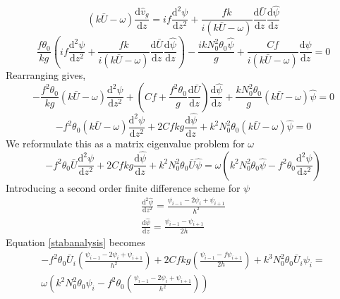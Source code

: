 \begin{equation*}
	(k\bar{U}-\omega)\frac{\text{d}\hat{v}_g}{\text{d}z} = if\frac{\text{d}^2{\psi}}{\text{d}z^2} + \frac{fk}{i(k\bar{U}-\omega)}\frac{\text{d}\bar{U}}{\text{d}z}\frac{\text{d}\hat{\psi}}{\text{d}z}
\end{equation*}
\begin{equation*}
	\frac{f\theta_0}{kg}\left(if\frac{\text{d}^2{\psi}}{\text{d}z^2} + \frac{fk}{i(k\bar{U}-\omega)}\frac{\text{d}\bar{U}}{\text{d}z}\frac{\text{d}\hat{\psi}}{\text{d}z}\right) - \frac{ik N_0^2\theta_0\hat{\psi}}{g} + \frac{Cf}{i(k\bar{U}-\omega)}\frac{\text{d}\psi}{\text{d}z} =0
\end{equation*}
Rearranging gives,
\begin{equation*}
	-\frac{f^2\theta_0}{kg}(k\bar{U}-\omega)\frac{\text{d}^2{\psi}}{\text{d}z^2}+\left(Cf+\frac{f^2\theta_0}{g}\frac{\text{d}\bar{U}}{\text{d}z}\right)\frac{\text{d}\hat{\psi}}{\text{d}z}+\frac{k N_0^2\theta_0}{g}(k\bar{U}-\omega)\hat{\psi}=0
\end{equation*}
\begin{equation*}
	-f^2\theta_0(k\bar{U}-\omega)\frac{\text{d}^2{\psi}}{\text{d}z^2}+2Cfkg\frac{\text{d}\hat{\psi}}{\text{d}z}+k^2 N_0^2\theta_0(k\bar{U}-\omega)\hat{\psi}=0
\end{equation*}
We reformulate this as a matrix eigenvalue problem for $\omega$
\begin{equation}
	-f^2\theta_0\bar{U}\frac{\text{d}^2{\psi}}{\text{d}z^2}+2Cfkg\frac{\text{d}\hat{\psi}}{\text{d}z}+k^2 N_0^2\theta_0\bar{U}\hat{\psi}=\omega \left(k^2N_0^2\theta_0\hat{\psi}-f^2\theta_0 \frac{\text{d}^2{\psi}}{\text{d}z^2}\right)
\label{stabanalysis}
\end{equation}
Introducing a second order finite difference scheme for $\psi$
\begin{equation*}
	\begin{aligned}
	\frac{\text{d}^2{\hat{\psi}}}{\text{d}z^2} = \frac{\psi_{i-1} - 2\psi_i + \psi_{i+1}}{h^2}\\
	\frac{\text{d}\hat{\psi}}{\text{d}z} = \frac{\psi_{i-1} - \psi_{i+1}}{2h}
	\end{aligned}
\end{equation*}
Equation \ref{stabanalysis} becomes
\begin{equation}
	\begin{aligned}
	-f^2\theta_0\bar{U}_i\left(\frac{\psi_{i-1} - 2\psi_i + \psi_{i+1}}{h^2}\right)+2Cfkg\left(\frac{\psi_{i-1} -f \psi_{i+1}}{2h}\right)+k^3 N_0^2\theta_0\bar{U}_i\psi_i= \\
	\omega\left(k^2N_0^2\theta_0\psi_i-f^2\theta_0\left(\frac{\psi_{i-1} - 2\psi_i + \psi_{i+1}}{h^2}\right)\right)
	\end{aligned}
\end{equation}
